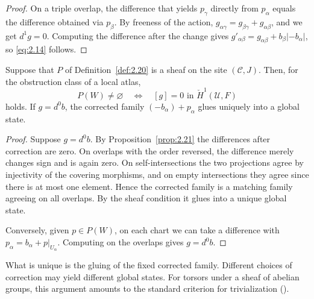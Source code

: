 \begin{proof}

On a triple overlap, the difference that yields $p_\gamma$ directly from $p_\alpha$ equals
the difference obtained via $p_\beta$. By freeness of the action,
$g_{\alpha\gamma}=g_{\beta\gamma}+g_{\alpha\beta}$, and we get $d^1g=0$. Computing the
difference after the change gives $g'_{\alpha\beta}=g_{\alpha\beta}+b_\beta|-b_\alpha|$,
so \eqref{eq:2.14} follows.

\end{proof}

\begin{theorem}\label{thm:2.22}

Suppose that $P$ of Definition~\ref{def:2.20} is a sheaf on the site $(\mathcal{C},J)$.
Then, for the obstruction class of a local atlas,
\begin{equation*}
P(W)\ne\varnothing
\quad\Longleftrightarrow\quad
[g]=0\text{ in }\check H^1(\mathcal{U},F)
\tag{2.15}\label{eq:2.15}
\end{equation*}
holds. If $g=d^0b$, the corrected family $(-b_\alpha)+p_\alpha$ glues uniquely into a
global state.

\end{theorem}

\begin{proof}

Suppose $g=d^0b$. By Proposition~\ref{prop:2.21} the differences after correction are
zero. On overlaps with the order reversed, the difference merely changes sign and is again
zero. On self-intersections the two projections agree by injectivity of the covering
morphisms, and on empty intersections they agree since there is at most one element. Hence
the corrected family is a matching family agreeing on all overlaps. By the sheaf condition
it glues into a unique global state.

Conversely, given $p\in P(W)$, on each chart we can take a difference with
$p_\alpha=b_\alpha+p|_{U_\alpha}$. Computing on the overlaps gives $g=d^0b$.

\end{proof}

What is unique is the gluing of the fixed corrected family. Different choices of
correction may yield different global states. For torsors under a sheaf of abelian groups,
this argument amounts to the standard criterion for trivialization
(\cite[\href{https://stacks.math.columbia.edu/tag/03AG}{\S21.4, Tag~03AG}]{Stacks}).


